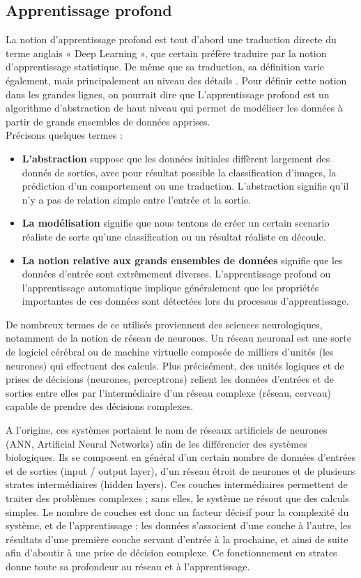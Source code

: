 \documentclass[12pt]{article}
\begin{document}
\subsection{Apprentissage profond}
La notion d’apprentissage profond est tout d’abord une traduction directe du terme anglais « Deep Learning », que certain préfère traduire par la notion d’apprentissage statistique. De même que sa traduction, sa définition varie également, mais principalement au niveau des détails \cite{9}. %
Pour définir cette notion dans les grandes lignes, on pourrait dire que L’apprentissage profond est un algorithme d'abstraction de haut niveau qui permet de modéliser les données à partir de grands ensembles de données apprises.\\
Précisons quelques termes \cite{10}:
\begin{itemize}
	\item \textbf{L'abstraction} suppose que les données initiales diffèrent largement des donnés de sorties, avec pour résultat possible la classification d’images, la prédiction d’un comportement ou une traduction. L'abstraction signifie qu'il n'y a pas de relation simple entre l'entrée et la sortie.
	\item \textbf{La modélisation} signifie que nous tentons de créer un certain scenario réaliste de sorte qu'une classification ou un résultat réaliste en découle.
	\item \textbf{La notion relative aux grands ensembles de données} signifie que les données d’entrée sont extrêmement diverses. L'apprentissage profond ou l'apprentissage automatique implique généralement que les propriétés importantes de ces données sont détectées lors du processus d'apprentissage.
\end{itemize}

De nombreux termes de ce utilisés proviennent des sciences neurologiques, notamment de la notion de réseau de neurones. Un réseau neuronal est une sorte de logiciel cérébral ou de machine virtuelle composée de milliers d’unités (les neurones) qui effectuent des calculs. Plus précisément, des unités logiques et de prises de décisions (neurones, perceptrons) relient les données d’entrées et de sorties entre elles par l’intermédiaire d’un réseau complexe (réseau, cerveau) capable de prendre des décisions complexes.

A l'origine, ces systèmes portaient le nom de réseaux artificiels de neurones (ANN, Artificial Neural Networks) afin de les différencier des systèmes biologiques. Ils se composent en général d’un certain nombre de données d'entrées et de sorties (input / output layer), d’un réseau étroit de neurones et de plusieurs strates intermédiaires (hidden layers). Ces couches intermédiaires permettent de traiter des problèmes complexes ; sans elles, le système ne résout que des calculs simples. Le nombre de couches est donc un facteur décisif pour la complexité du système, et de l’apprentissage ; les données s’associent d’une couche à l’autre, les résultats d’une première couche servant d’entrée à la prochaine, et ainsi de suite afin d’aboutir à une prise de décision complexe. Ce fonctionnement en strates donne toute sa profondeur au réseau et à l’apprentissage.
\end{document}

